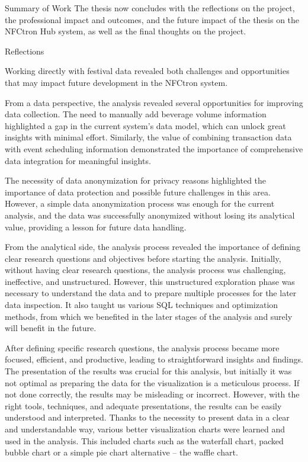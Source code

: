 \begin{section}{Summary of Work}
	The thesis now concludes with the reflections on the project, the professional impact and outcomes, and the future impact of the thesis on the NFCtron Hub system, as well as the final thoughts on the project.
\end{section}

\begin{section}{Reflections}
	\label{sec:conclusion-reflections}

	Working directly with festival data revealed both challenges and opportunities that may impact future development in the NFCtron system.

	From a data perspective, the analysis revealed several opportunities for improving data collection.
	The need to manually add beverage volume information highlighted a gap in the current system's data model, which can unlock great insights with minimal effort.
	Similarly, the value of combining transaction data with event scheduling information demonstrated the importance of comprehensive data integration for meaningful insights.

	The necessity of data anonymization for privacy reasons highlighted the importance of data protection and possible future challenges in this area.
	However, a simple data anonymization process was enough for the current analysis, and the data was successfully anonymized without losing its analytical value, providing a lesson for future data handling.

	From the analytical side, the analysis process revealed the importance of defining clear research questions and objectives before starting the analysis.
	Initially, without having clear research questions, the analysis process was challenging, ineffective, and unstructured.
	However, this unstructured exploration phase was necessary to understand the data and to prepare multiple processes for the later data inspection.
	It also taught us various SQL techniques and optimization methods, from which we benefited in the later stages of the analysis and surely will benefit in the future.

	After defining specific research questions, the analysis process became more focused, efficient, and productive, leading to straightforward insights and findings.
	The presentation of the results was crucial for this analysis, but initially it was not optimal as preparing the data for the visualization is a meticulous process.
	If not done correctly, the results may be misleading or incorrect.
	However, with the right tools, techniques, and adequate presentations, the results can be easily understood and interpreted.
	Thanks to the necessity to present data in a clear and understandable way, various better visualization charts were learned and used in the analysis.
	This included charts such as the waterfall chart, packed bubble chart or a simple pie chart alternative – the waffle chart.


\end{section}
